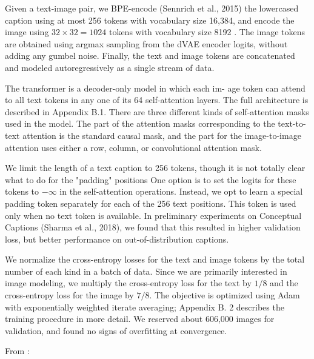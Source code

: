 \documentclass{article}
\begin{document}
\begin{appendix}
{Given a text-image pair, we BPE-encode (Sennrich et al., 2015) the lowercased caption using at most 256 tokens with vocabulary size 16,384, and encode the image using $32 \times 32=1024$ tokens with vocabulary size 8192 .
The image tokens are obtained using argmax sampling from the dVAE encoder logits, without adding any gumbel noise.
Finally, the text and image tokens are concatenated and modeled autoregressively as a single stream of data.

The transformer is a decoder-only model in which each im- age token can attend to all text tokens in any one of its 64 self-attention layers. The full architecture is described in Appendix B.1. There are three different kinds of self-attention masks used in the model. The part of the attention masks corresponding to the text-to-text attention is the standard causal mask, and the part for the image-to-image attention uses either a row, column, or convolutional attention mask.

We limit the length of a text caption to 256 tokens, though it is not totally clear what to do for the "padding" positions One option is to set the logits for these tokens to $-\infty$ in the self-attention operations. Instead, we opt to learn a special padding token separately for each of the 256 text positions. This token is used only when no text token is available. In preliminary experiments on Conceptual Captions (Sharma et al., 2018), we found that this resulted in higher validation loss, but better performance on out-of-distribution captions.

We normalize the cross-entropy losses for the text and image tokens by the total number of each kind in a batch of data. Since we are primarily interested in image modeling, we multiply the cross-entropy loss for the text by $1 / 8$ and the cross-entropy loss for the image by $7 / 8$. The objective is optimized using Adam with exponentially weighted iterate averaging; Appendix B. 2 describes the training procedure in more detail. We reserved about 606,000 images for validation, and found no signs of overfitting at convergence.
}

From \cite{deepgen}:


\end{appendix}
\end{document}
